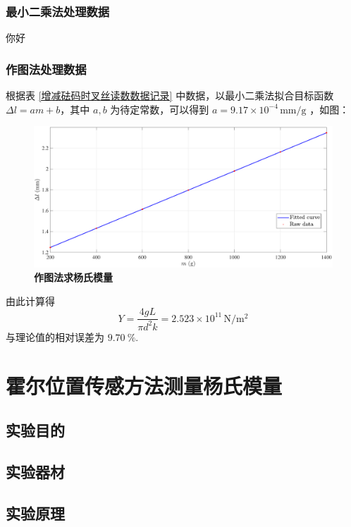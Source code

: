 \documentclass[zihao=5, UTF8]{article}
\theoremstyle{MyLineTheoremStyle} %
\theoremstyle{MyBlockTheoremStyle} %
\theoremstyle{MySubsubsectionStyle} %
\begin{document}
\subsubsection{最小二乘法处理数据}
你好
\subsubsection{作图法处理数据}

根据表 \ref{增减砝码时叉丝读数数据记录} 中数据，以最小二乘法拟合目标函数 $\Delta l = am+b $，其中 $a,b$ 为待定常数，可以得到 $a= 9.17\times10^{-4}\,\mathrm{mm/g}$ ，如图：

\begin{figure}[H]
    \centering
    \includegraphics[width=\textwidth]{assets/2024-08-23_19-54-13.pdf}
    \caption{\textbf{作图法求杨氏模量}}\label{作图法求杨氏模量}
\end{figure}

由此计算得
	\begin{equation}
        Y=\frac{4gL}{\pi d^2k}=2.523\times10^{11}\,\mathrm{N/m^2}
    \end{equation}
与理论值的相对误差为 $9.70\ \%$.

\newpage
\section{霍尔位置传感方法测量杨氏模量}

\subsection{实验目的}
\subsection{实验器材}
\subsection{实验原理}
\end{document}
